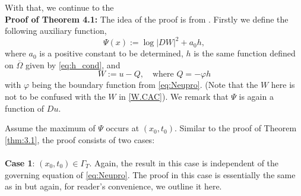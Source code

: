 \documentclass[12pt]{article}
\numberwithin{equation}{section}
\theoremstyle{plain}
\theoremstyle{definition}
\theoremstyle{remark}
\begin{document}
With that, we continue to the\\
\textbf{Proof of Theorem 4.1:}
The idea of the proof is from \cite{MWW}. Firstly we define the following auxiliary function, 
\begin{equation} \label{eq:neuaux}
    \Psi(x) := \log{|DW|^2} + a_0 h, 
\end{equation}
where $a_0$ is a positive constant to be determined, $h$ is the same function defined on $\overline{\Omega}$ given by \eqref{eq:h_cond}, and 
\begin{equation*}
    W := u -Q,\quad\text{where $Q=- \varphi h$}
\end{equation*}
with $\varphi$ being the boundary function from \eqref{eq:Neupro}.
(Note that the $W$ here is not to be confused with the $W$ in \eqref{W.CAC}).
We remark that $\Psi$ is again a function of $Du$.  

Assume the maximum of $\Psi$ occurs at $(x_0,t_0)$. Similar to the proof of Theorem \ref{thm:3.1}, the proof consists of two cases: \\ \\
\textbf{Case 1}: $(x_0,t_0) \in \Gamma_T$. Again, the result in this case is independent of the governing equation of \eqref{eq:Neupro}. The proof in this case is essentially the same as in \cite{MWW} but again, for reader's convenience, we outline it here.
\end{document}
